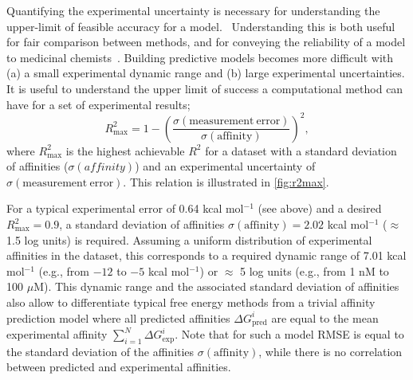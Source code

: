 \documentclass[9pt,bestpractices]{livecoms}
\begin{document}
Quantifying the experimental uncertainty is necessary for understanding the upper-limit of feasible accuracy for a model.~\cite{brown2009healthy} Understanding this is both useful for fair comparison between methods, and for conveying the reliability of a model to medicinal chemists~\cite{griffen2020chemists}. Building predictive models becomes more difficult with (a) a small experimental dynamic range and (b) large experimental uncertainties. It is useful to understand the upper limit of success a computational method can have for a set of experimental results;
%
\begin{equation}\label{eqn:r2max}
    R^2_{\mathrm{max}} = 1 - \left(\frac{\sigma(\mathrm{measurement\   error})}{\sigma({\mathrm{affinity}})}\right) ^2,
\end{equation}
%
where $R^2_{\mathrm{max}}$ is the highest achievable $R^2$ for a dataset with a standard deviation of affinities ($\sigma(affinity)$) and an experimental uncertainty of  $\sigma\mathrm{(measurement\ error)}$\cite{sheridan2020experimental}. This relation is illustrated in \ref{fig:r2max}.

For a typical experimental error of 0.64 kcal mol$^{-1}$ (see above) and a desired $R^2_{\mathrm{max}} = 0.9$, a standard deviation of affinities $\sigma(\mathrm{affinity}) = 2.02 $ kcal mol$^{-1}$ ($\approx$1.5 log units) is required. Assuming a uniform distribution of experimental affinities in the dataset, this corresponds to a required dynamic range of 7.01 kcal mol$^{-1}$ (e.g., from $-12$ to $-5$ kcal mol$^{-1}$) or $\approx$ 5 log units (e.g., from 1 nM to 100 $\mu$M). This dynamic range and the associated standard deviation of affinities also allow to differentiate typical free energy methods from a trivial affinity prediction model where all predicted affinities $\Delta G_{\text{pred}}^i$ are equal to the mean experimental affinity $\sum_{i=1}^{N} \Delta G_{\text{exp}}^i$. Note that for such a model RMSE is equal to the standard deviation of the affinities $\sigma({\mathrm{affinity}})$, while there is no correlation between predicted and experimental affinities.
\end{document}
